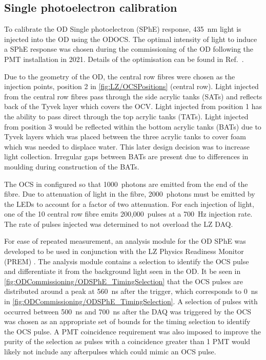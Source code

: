 \subsection{Single photoelectron calibration}\label{sec:ODComissioning/SPhECalib}
To calibrate the OD Single photoelectron (SPhE) response, 435~nm light is injected into the OD using the ODOCS. The optimal intensity of light to induce a SPhE response was chosen during the commissioning of the OD following the PMT installation in 2021. Details of the optimisation can be found in Ref.~\cite{edfraser:thesis}.

Due to the geometry of the OD, the central row fibres were chosen as the injection points, position 2 in \autoref{fig:LZ/OCSPositions} (central row). Light injected from the central row fibres pass through the side acrylic tanks (SATs) and reflects back of the Tyvek layer which covers the OCV.
Light injected from position 1 has the ability to pass direct through the top acrylic tanks (TATs). Light injected from position 3 would be reflected within the bottom acrylic tanks (BATs) due to Tyvek layers which was placed between the three acrylic tanks to cover foam which was needed to displace water. This later design decision was to increase light collection. Irregular gaps between BATs are present due to differences in moulding during construction of the BATs.

The OCS in configured so that 1000~photons are emitted from the end of the fibre. Due to attenuation of light in the fibre, 2000~photons must be emitted by the LEDs to account for a factor of two attenuation. For each injection of light, one of the 10 central row fibre emits 200,000~pulses at a 700~Hz injection rate. The rate of pulses injected was determined to not overload the LZ DAQ.

For ease of repeated measurement, an analysis module for the OD SPhE was developed to be used in conjunction with the LZ Physics Readiness Monitor (PREM) \cite{LZTDR}. The analysis module contains a selection to identify the OCS pulse and differentiate it from the background light seen in the OD. It be seen in \autoref{fig:ODCommissioning/ODSPhE_TimingSelection} that the OCS pulses are distributed around a peak at 560~ns after the trigger, which corresponds to 0~ns in \autoref{fig:ODCommissioning/ODSPhE_TimingSelection}. A selection of pulses with occurred between 500~ns and 700~ns after the DAQ was triggered by the OCS was chosen as an appropriate set of bounds for the timing selection to identify the OCS pulse. A PMT coincidence requirement was also imposed to improve the purity of the selection as pulses with a coincidence greater than 1 PMT would likely not include any afterpulses which could mimic an OCS pulse.

